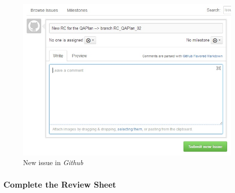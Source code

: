 \documentclass{template/openetcs_article}
\begin{document}
\begin{figure}
\centering
\includegraphics [width=\textwidth]{./figures/NewIssue.JPG}
\caption{New issue in {\it Github}}
\end{figure}

\subsubsection{Complete the Review Sheet}
\end{document}
